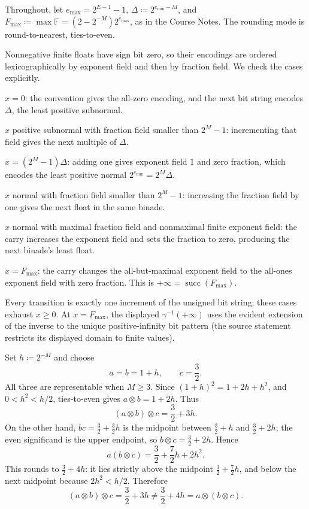 \documentclass[11pt,oneside]{article}
\begin{document}
\begin{solution}
Throughout, let $e_{\max}=2^{E-1}-1$,
$\Delta\coloneqq2^{e_{\min}-M}$, and
$F_{\max}\coloneqq\max\mathbb F=(2-2^{-M})2^{e_{\max}}$,
as in the Course Notes.
The rounding mode is round-to-nearest, ties-to-even.
\begin{problemsubparts}
\item Nonnegative finite floats have sign bit zero, so their encodings
are ordered lexicographically by exponent field and then by fraction
field. We check the cases explicitly.
\begin{problemchoices}
\item $x=0$: the convention gives the all-zero encoding, and the next
bit string encodes $\Delta$, the least positive subnormal.
\item $x$ positive subnormal with fraction field smaller than
$2^M-1$: incrementing that field gives the next multiple of $\Delta$.
\item $x=(2^M-1)\Delta$: adding one gives exponent field $1$
and zero fraction, which encodes the least positive normal
$2^{e_{\min}}=2^M\Delta$.
\item $x$ normal with fraction field smaller than $2^M-1$:
increasing the fraction field by one gives the next float in the
same binade.
\item $x$ normal with maximal fraction field and nonmaximal finite
exponent field: the carry increases the exponent field and sets the
fraction to zero, producing the next binade's least float.
\item $x=F_{\max}$: the carry changes the all-but-maximal exponent
field to the all-ones exponent field with zero fraction. This is
$+\infty=\operatorname{succ}(F_{\max})$.
\end{problemchoices}
Every transition is exactly one increment of the unsigned bit string;
these cases exhaust $x\ge0$. At $x=F_{\max}$, the displayed
$\gamma^{-1}(+\infty)$ uses the evident extension of the inverse
to the unique positive-infinity bit pattern (the source statement
restricts its displayed domain to finite values).

\item Set $h\coloneqq2^{-M}$ and choose
\[
 a=b=1+h, \qquad c=\frac32.
\]
All three are representable when $M\ge3$. Since
$(1+h)^2=1+2h+h^2$, and $0<h^2<h/2$, ties-to-even gives
$a\otimes b=1+2h$. Thus
\[
 (a\otimes b)\otimes c
 =\frac32+3h.
\]
On the other hand,
$bc=\frac32+\frac32h$ is the midpoint between
$\frac32+h$ and $\frac32+2h$; the even significand is the
upper endpoint, so $b\otimes c=\frac32+2h$. Hence
\[
 a(b\otimes c)=\frac32+\frac72h+2h^2.
\]
This rounds to $\frac32+4h$: it lies strictly above the
midpoint $\frac32+\frac72h$, and below the next midpoint
because $2h^2<h/2$. Therefore
\[
 (a\otimes b)\otimes c=\frac32+3h
 \ne\frac32+4h=a\otimes(b\otimes c).
\]


\end{problemsubparts}
\end{solution}
\end{document}
